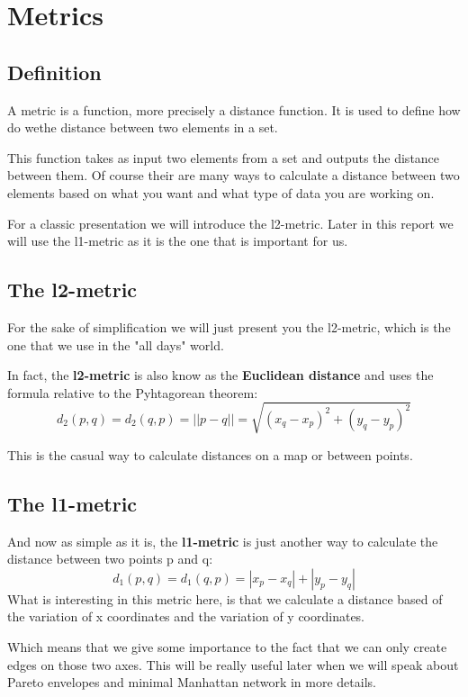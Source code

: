 \chapter{Metrics}
\section{Definition}%
A metric is a function, more precisely a distance function. It is used to define how do wethe distance between two elements in a set.

This function takes as input two elements from a set and outputs the distance between them. Of course their are many ways to calculate a distance between two elements based on what you want and what type of data you are working on.

For a classic presentation we will introduce the l2-metric. Later in this report we will use the l1-metric as it is the one that is important for us.
\section{The l2-metric}%
For the sake of simplification we will just present you the l2-metric, which is the one that we use in the "all days" world.

In fact, the \textbf{l2-metric} is also know as the \textbf{Euclidean distance} and uses the formula relative to the Pyhtagorean theorem:
	\[d_2(p,q)= d_2(q,p) = ||p - q|| = \sqrt{(x_q-x_p)^2+(y_q-y_p)^2}\]
	
This is the casual way to calculate distances on a map or between points.
\section{The l1-metric}%
	And now as simple as it is, the \textbf{l1-metric} is just another way to calculate the distance between two points p and q:
	\[ d_{1}(p,q)= d_{1}(q,p) = |x_p-x_q|+|y_p-y_q|\]
What is interesting in this metric here, is that we calculate a distance based of the variation of x coordinates and the variation of y coordinates.

Which means that we give some importance to the fact that we can only create edges on those two axes. This will be really useful later when we will speak about Pareto envelopes and minimal Manhattan network in more details.